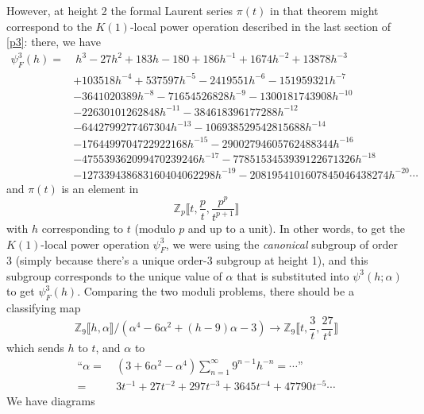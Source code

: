 \documentclass{rs}
\theoremstyle{definition}
\theoremstyle{remark}
\newcommand{\mb}[1]{\mathbb{#1}}
\newcommand{\BZ}{{\mb Z}}
\newcommand{\A}{\alpha}
\newcommand{\p}{\psi^3}
\newcommand{\lb}{\llbracket}
\newcommand{\rb}{\rrbracket}
\numberwithin{equation}{section}
\numberwithin{thm}{section}
\begin{document}
However, at height 2 the formal Laurent series $\pi(t)$ in that theorem might correspond to the $K(1)$-local power operation 
described in the last section of \href{http://arxiv.org/abs/1210.3730}{[p3]}: there, we have 
\begin{equation}
\label{h}
 \begin{split}
  \p_F(h) = & ~ h^3 - 27 h^2 + 183 h - 180 + 186 h^{-1} + 1674 h^{-2} + 13878 h^{-3} \\
            & + 103518 h^{-4} + 537597 h^{-5} - 2419551 h^{-6} - 151959321 h^{-7} \\
            & - 3641020389 h^{-8} - 71654526828 h^{-9} - 1300181743908 h^{-10} \\
            & - 22630101262848 h^{-11} - 384618396177288 h^{-12} \\
            & - 6442799277467304 h^{-13} - 106938529542815688 h^{-14} \\
            & - 1764499704722922168 h^{-15} - 29002794605762488344 h^{-16} \\
            & - 475539362099470239246 h^{-17} - 7785153453939122671326 h^{-18} \\
            & - 127339438683160404062298 h^{-19} - 2081954101607845046438274 h^{-20} \cdots 
 \end{split}
\end{equation}
and $\pi(t)$ is an element in 
\[
 \BZ_p \lb t, \frac{p}{t}, \frac{p^p}{t^{p+1}} \rb 
\]
with $h$ corresponding to $t$ (modulo $p$ and up to a unit).  
In other words, to get the $K(1)$-local power operation $\p_F$, we were using the {\em canonical} subgroup of order 3 
(simply because there's a unique order-3 subgroup at height 1), 
and this subgroup corresponds to the unique value of $\A$ that is substituted into $\p(h;\A)$ to get $\p_F(h)$.  
Comparing the two moduli problems, there should be a classifying map 
\[
 \BZ_9 \llbracket h, \A \rrbracket / (\A^4 - 6 \A^2 + (h - 9) \A - 3) \to \BZ_9 \llbracket t, \frac{3}{t}, \frac{27}{t^4} \rrbracket 
\]
which sends $h$ to $t$, and $\A$ to 
\begin{equation*}
 \begin{split}
  \text{``}\A = & ~ (3 + 6 \A^2 - \A^4) \sum_{n=1}^\infty 9^{n-1} h^{-n} = \cdots \text{''} \\
              = & ~ 3 t^{-1} + 27 t^{-2} + 297 t^{-3} + 3645 t^{-4} + 47790 t^{-5} \cdots 
 \end{split}
\end{equation*}
We have diagrams 
\end{document}
